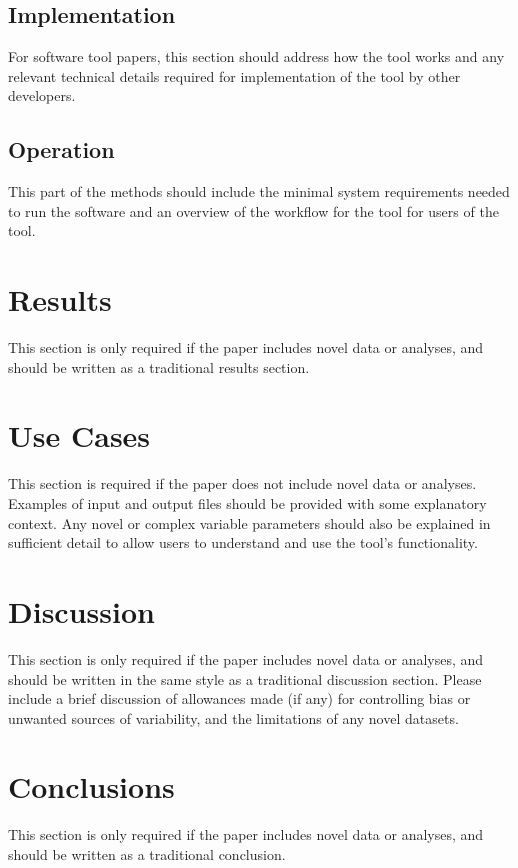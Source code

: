 \documentclass[9pt,a4paper]{extarticle}
\begin{document}
\subsection*{Implementation}
For software tool papers, this section should address how the tool works and any relevant technical details required for implementation of the tool by other developers.  

\subsection*{Operation}
This part of the methods should include the minimal system requirements needed to run the software and an overview of the workflow for the tool for users of the tool.


\section*{Results} %
This section is only required if the paper includes novel data or analyses, and should be written as a traditional results section.

\section*{Use Cases} %
This section is required if the paper does not include novel data or analyses. 
Examples of input and output files should be provided with some explanatory context.  Any novel or complex variable parameters should also be explained in sufficient detail to allow users to understand and use the tool's functionality.

\section*{Discussion} %
This section is only required if the paper includes novel data or analyses, and should be written in the same style as a traditional discussion section.
Please include a brief discussion of allowances made (if any) for controlling bias or unwanted sources of variability, and the limitations of any novel datasets.


\section*{Conclusions} %
This section is only required if the paper includes novel data or analyses, and should be written as a traditional conclusion.
\end{document}
